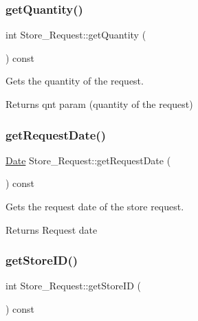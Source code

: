 \subsubsection{\texorpdfstring{get\+Quantity()}{getQuantity()}}
{\footnotesize\ttfamily int Store\+\_\+\+Request\+::get\+Quantity (\begin{DoxyParamCaption}{ }\end{DoxyParamCaption}) const}



Gets the quantity of the request. 

\begin{DoxyReturn}{Returns}
qnt param (quantity of the request) 
\end{DoxyReturn}
\mbox{\label{class_store___request_ad7e54515056bd56878bb933a4ccff2a2}} 
\subsubsection{\texorpdfstring{get\+Request\+Date()}{getRequestDate()}}
{\footnotesize\ttfamily \hyperlink{class_date}{Date} Store\+\_\+\+Request\+::get\+Request\+Date (\begin{DoxyParamCaption}{ }\end{DoxyParamCaption}) const}



Gets the request date of the store request. 

\begin{DoxyReturn}{Returns}
Request date 
\end{DoxyReturn}
\mbox{\label{class_store___request_a5fb72da2677412686a919e705714a85d}} 
\subsubsection{\texorpdfstring{get\+Store\+I\+D()}{getStoreID()}}
{\footnotesize\ttfamily int Store\+\_\+\+Request\+::get\+Store\+ID (\begin{DoxyParamCaption}{ }\end{DoxyParamCaption}) const}




